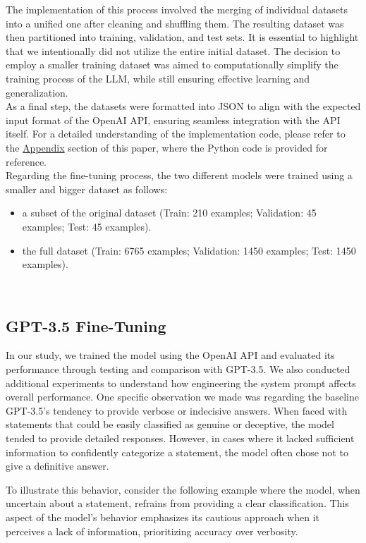 \documentclass[10pt,twocolumn,letterpaper]{article}
\begin{document}
The implementation of this process involved the merging of individual datasets into a unified one after cleaning and shuffling them.
The resulting dataset was then partitioned into training, validation, and test sets. It is essential 
to highlight that we intentionally did not utilize the entire initial dataset. The decision to employ a smaller 
training dataset was aimed to computationally simplify the training process of the LLM, while still ensuring effective learning and generalization. \\

As a final step, the datasets were formatted into JSON to align with the expected input format of the OpenAI API, ensuring seamless integration with the API itself. 
For a detailed understanding of the implementation code, please refer to the \hyperref[sec:appendix]{Appendix} section of this paper, where the Python code is provided for reference.\\

Regarding the fine-tuning process, the two different models were trained using a smaller and bigger dataset as follows:

\begin{itemize}
    \item a subset of the original dataset (Train: 210 examples; Validation: 45 examples; Test: 45 examples).
    \item the full dataset (Train: 6765 examples; Validation: 1450 examples; Test: 1450 examples).
\end{itemize} \\

\subsection{GPT-3.5 Fine-Tuning}

In our study, we trained the model using the OpenAI API and evaluated its performance through testing 
and comparison with GPT-3.5. We also conducted additional experiments to understand how engineering 
the system prompt affects overall performance. One specific observation we made was regarding the baseline 
GPT-3.5's tendency to provide verbose or indecisive answers. When faced with statements that could be easily 
classified as genuine or deceptive, the model tended to provide detailed responses. However, in cases where 
it lacked sufficient information to confidently categorize a statement, the model often chose not to give a 
definitive answer.

To illustrate this behavior, consider the following example where the model, 
when uncertain about a statement, refrains from providing a clear classification. 
This aspect of the model's behavior emphasizes its cautious approach when it perceives a lack of information, 
prioritizing accuracy over verbosity.
\end{document}
